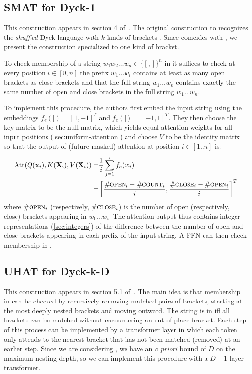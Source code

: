 \subsection{SMAT for Dyck-1}
This construction appears in section 4 of~\citet{bhattamishra2020ability}. The original construction to recognizes the \textit{shuffled} Dyck language with $k$ kinds of brackets . Since  coincides with , we present the construction specialized to one kind of bracket.

To check membership of a string $w_1w_2\ldots w_{n} \in \{[,] \}^n$ in  it suffices to check at every position $i \in [0,n]$ the prefix $w_1 \ldots w_i$ contains at least as many open brackets as close brackets and that the full string $w_1 \ldots w_n$ contains exactly the same number of open and close brackets in the full string $w_1\ldots w_n$.

To implement this procedure, the authors first embed the input string using the embeddings $f_e([) = [1,-1]^T$ and $f_e(]) = [-1,1]^T$. They then choose the key matrix to be the null matrix, which yields equal attention weights for all input positions (\cref{sec:uniform-attention}) and choose $V$ to be the identity matrix so that the output of (future-masked) attention at position $i \in [1..n]$ is:\begin{align*}
    \mathrm{Att}(Q(\mathbf{x}_i), K(\mathbf{X}_i), V(\mathbf{X}_i)) = & \frac{1}{i}\sum_{j=1}^i f_e(w_i)\\
    = & \left[ \frac{{\#}\textsc{open}_i - {\#}\textsc{count}_i}{i}, \frac{{\#}\textsc{close}_i - {\#}\textsc{open}_i}{i}\right]^T
\end{align*}
where ${\#}\textsc{open}_i$ (respectively, ${\#}\textsc{close}_i$) is the number of open (respectively, close) brackets appearing in $w_1\ldots w_i$. The attention output thus contains integer representations (\cref{sec:integers}) of the difference between the number of open and close brackets appearing in each prefix of the input string. A FFN can then check membership in .

\subsection{UHAT for Dyck-k-D}
This construction appears in section 5.1 of~\citet{yao-2021-self-attention}.
The main idea is that membership in  can be checked by recursively removing matched pairs of brackets, starting at the most deeply nested brackets and moving outward. The string is in  iff all brackets can be matched without encountering an out-of-place bracket. Each step of this process can be implemented by a transformer layer in which each token only attends to the nearest bracket that has not been matched (removed) at an earlier step. Since we are considering , we have an \textit{a priori} bound of $D$ on the maximum nesting depth, so we can implement this procedure with a $D+1$ layer transformer. 

